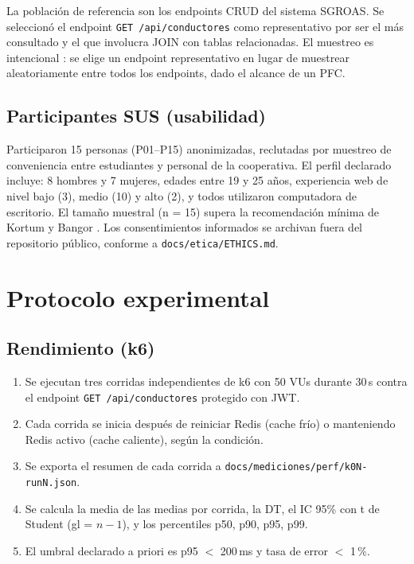 La población de referencia son los endpoints CRUD del sistema SGROAS. Se seleccionó el endpoint \texttt{GET /api/conductores} como representativo por ser el más consultado y el que involucra JOIN con tablas relacionadas. El muestreo es intencional \cite{baltes2022}: se elige un endpoint representativo en lugar de muestrear aleatoriamente entre todos los endpoints, dado el alcance de un PFC.

\subsection{Participantes SUS (usabilidad)}

Participaron 15 personas (P01--P15) anonimizadas, reclutadas por muestreo de conveniencia entre estudiantes y personal de la cooperativa. El perfil declarado incluye: 8 hombres y 7 mujeres, edades entre 19 y 25 años, experiencia web de nivel bajo (3), medio (10) y alto (2), y todos utilizaron computadora de escritorio. El tamaño muestral (n = 15) supera la recomendación mínima de Kortum y Bangor \cite{kortum2013}. Los consentimientos informados se archivan fuera del repositorio público, conforme a \texttt{docs/etica/ETHICS.md}.

\section{Protocolo experimental}
\label{sec:protocolo}

\subsection{Rendimiento (k6)}

\begin{enumerate}
  \item Se ejecutan tres corridas independientes de k6 con 50 VUs durante 30\,s contra el endpoint \texttt{GET /api/conductores} protegido con JWT.
  \item Cada corrida se inicia después de reiniciar Redis (cache frío) o manteniendo Redis activo (cache caliente), según la condición.
  \item Se exporta el resumen de cada corrida a \texttt{docs/mediciones/perf/k0N-runN.json}.
  \item Se calcula la media de las medias por corrida, la DT, el IC 95\% con t de Student (gl = $n - 1$), y los percentiles p50, p90, p95, p99.
  \item El umbral declarado a priori es p95 $<$ 200\,ms y tasa de error $<$ 1\,\%.
\end{enumerate}

